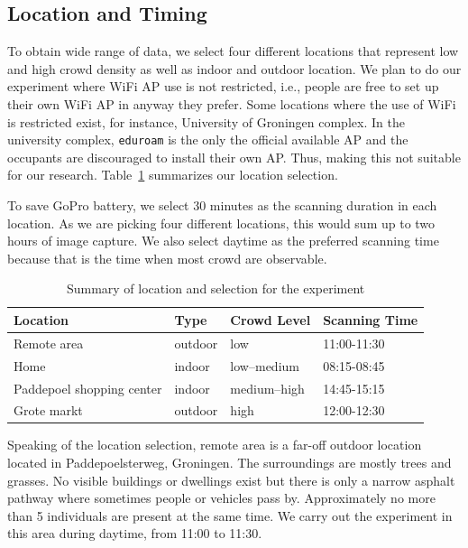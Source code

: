 \subsection{Location and Timing} %
\label{sub:location_and_timing}
To obtain wide range of data, we select four different locations that represent low and high crowd density as well as indoor and outdoor location. We plan to do our experiment where WiFi \ac{AP} use is not restricted, i.e., people are free to set up their own WiFi \ac{AP} in anyway they prefer. Some locations where the use of WiFi is restricted exist, for instance, University of Groningen complex. In the university complex, \verb|eduroam| is the only the official available \ac{AP} and the occupants are discouraged to install their own \ac{AP}. Thus, making this not suitable for our research. Table~\ref{tab:location-summary} summarizes our location selection.

To save GoPro battery, we select 30 minutes as the scanning duration in each location. As we are picking four different locations, this would sum up to two hours of image capture. We also select daytime as the preferred scanning time because that is the time when most crowd are observable.

\begin{table}[]
\centering
\caption{Summary of location and selection for the experiment}
\label{tab:location-summary}
\begin{tabular}{llll} \toprule
Location                  & Type    & Crowd Level & Scanning Time \\ \midrule
Remote area               & outdoor & low         & 11:00-11:30   \\
Home                      & indoor  & low--medium  & 08:15-08:45   \\
Paddepoel shopping center & indoor  & medium--high & 14:45-15:15   \\
Grote markt               & outdoor & high        & 12:00-12:30  \\ \bottomrule
\end{tabular}
\end{table}


Speaking of the location selection, remote area is a far-off outdoor location located in Paddepoelsterweg, Groningen. The surroundings are mostly trees and grasses. No visible buildings or dwellings exist but there is only a narrow asphalt pathway where sometimes people or vehicles pass by. Approximately no more than 5 individuals are present at the same time. We carry out the experiment in this area during daytime, from 11:00 to 11:30.

